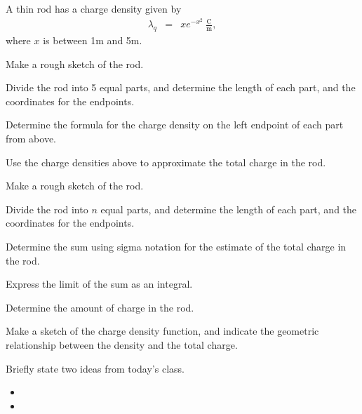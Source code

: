 
\begin{problem}
\item A thin rod has a charge density given by
  \begin{eqnarray*}
    \lambda_q & = & x e^{-x^2}~\frac{\mathrm{C}}{\mathrm{m}},
  \end{eqnarray*}
  where $x$ is between 1m and 5m.
  \begin{subproblem}
  \item Make a rough sketch of the rod.
    \vspace{4em}
  \item Divide the rod into 5 equal parts, and determine the length of
    each part, and the coordinates for the endpoints.
    \vfill
  \item Determine the formula for the charge density on the left
    endpoint of each part from above.
    \vfill
  \item Use the charge densities above to approximate the total charge in the rod.
    \vfill
    \clearpage
 \item Make a rough sketch of the rod.
      \vspace{3em}
\item Divide the rod into $n$ equal parts, and determine the length of
      each part, and the coordinates for the endpoints.
      \vfill
  \item Determine the sum using sigma notation for the estimate of the
    total charge in the rod.
    \vfill
  \item Express the limit of the sum as an integral.
    \vfill
  \item Determine the amount of charge in the rod.
    \vfill
  \item Make a sketch of the charge density function, and indicate the geometric relationship between the density and the total charge.
    \vfill
  \end{subproblem}
\end{problem}

\postClass

\begin{problem}
\item Briefly state two ideas from today's class.
  \begin{itemize}
  \item
  \item
  \end{itemize}
\item
  \begin{subproblem}
    \item
  \end{subproblem}
\end{problem}



